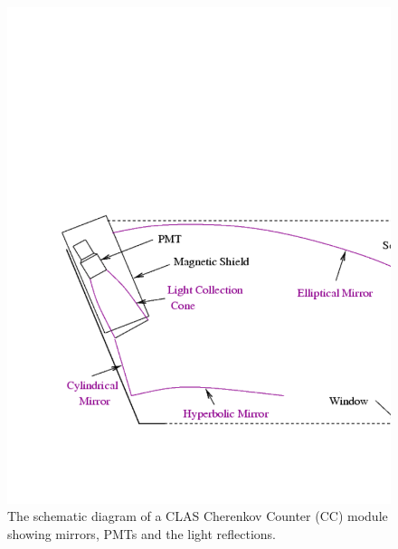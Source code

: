 \begin{figure}[h] %
\centering
\leavevmode \includegraphics[width=1.0\textwidth]{figuresEG4/FigExp/ccsegment}  %
\caption[A Cherenkov Counter module]{The schematic diagram of a CLAS Cherenkov Counter (CC) module showing mirrors, PMTs and the light reflections. %
}
\label{figccunit}%
\end{figure}







